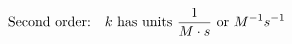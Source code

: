\documentclass[preview]{standalone}
\begin{document}
\begin{align*}
\special{dvisvgm:raw <g id='unique000'>}\text{Second order:} \quad k \text{ has units } \frac{1}{M \cdot s} \text{ or } M^{-1}s^{-1}\special{dvisvgm:raw </g>}
\end{align*}
\end{document}
